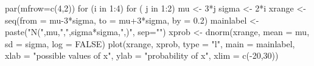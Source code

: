 \begin{Schunk}
\begin{Sinput}
 par(mfrow=c(4,2))
 for (i in 1:4){
     for ( j in 1:2) {
         mu <- 3*j
         sigma <- 2*i
         xrange <- seq(from = mu-3*sigma, to = mu+3*sigma, by = 0.2)
         mainlabel <- paste("N(",mu,",",sigma*sigma,",)", sep="")
         xprob <- dnorm(xrange, mean = mu, sd = sigma, log = FALSE)
         plot(xrange, xprob, type = "l", main = mainlabel, xlab = "possible values of x", ylab = "probability of x", xlim = c(-20,30))
      }
  }
\end{Sinput}
\end{Schunk}
